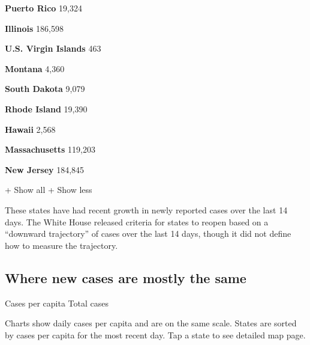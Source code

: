 \textbf{Puerto Rico} 19,324

\href{https://www.nytimes.com/interactive/2020/us/illinois-coronavirus-cases.html}{}

\textbf{Illinois} 186,598

\textbf{U.S. Virgin Islands} 463

\href{https://www.nytimes.com/interactive/2020/us/montana-coronavirus-cases.html}{}

\textbf{Montana} 4,360

\href{https://www.nytimes.com/interactive/2020/us/south-dakota-coronavirus-cases.html}{}

\textbf{South Dakota} 9,079

\href{https://www.nytimes.com/interactive/2020/us/rhode-island-coronavirus-cases.html}{}

\textbf{Rhode Island} 19,390

\href{https://www.nytimes.com/interactive/2020/us/hawaii-coronavirus-cases.html}{}

\textbf{Hawaii} 2,568

\href{https://www.nytimes.com/interactive/2020/us/massachusetts-coronavirus-cases.html}{}

\textbf{Massachusetts} 119,203

\href{https://www.nytimes.com/interactive/2020/us/new-jersey-coronavirus-cases.html}{}

\textbf{New Jersey} 184,845

+ Show all + Show less

These states have had recent growth in newly reported cases over the
last 14 days. The White House released criteria for states to reopen
based on a ``downward trajectory'' of cases over the last 14 days,
though it did not define how to measure the trajectory.

\hypertarget{where-new-cases-are-mostly-the-same}{%
\subsection{Where new cases are mostly the
same}\label{where-new-cases-are-mostly-the-same}}

Cases per capita Total cases

Charts show daily cases per capita and are on the same scale. States are
sorted by cases per capita for the most recent day. Tap a state to see
detailed map page.

\href{https://www.nytimes.com/interactive/2020/us/louisiana-coronavirus-cases.html}{}

